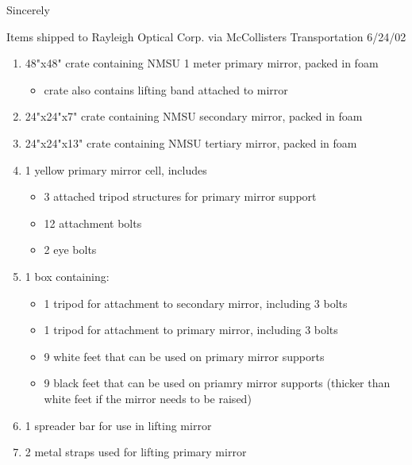 \documentclass{letter}
\begin{document}
\begin{letter}
\closing{Sincerely}

\newpage

Items shipped to Rayleigh Optical Corp. via McCollisters Transportation
         6/24/02

\begin{enumerate}
\item 48"x48" crate containing NMSU 1 meter primary mirror, packed in foam
  \begin{itemize}
   \item crate also contains lifting band attached to mirror
  \end{itemize}

\item 24"x24"x7" crate containing NMSU secondary mirror, packed in foam

\item 24"x24"x13" crate containing NMSU tertiary mirror, packed in foam

\item 1 yellow primary mirror cell, includes
  \begin{itemize}
     \item 3 attached tripod structures for primary mirror support
     \item 12 attachment bolts
     \item 2 eye bolts
  \end{itemize}

\item 1 box containing:
  \begin{itemize}
     \item 1 tripod for attachment to secondary mirror, including 3 bolts
     \item 1 tripod for attachment to primary mirror, including 3 bolts
     \item 9 white feet that can be used on primary mirror supports
     \item 9 black feet that can be used on priamry mirror supports (thicker than
       white feet if the mirror needs to be raised)
  \end{itemize}

\item 1 spreader bar for use in lifting mirror

\item 2 metal straps used for lifting primary mirror

\end{enumerate}
\end{letter}
\end{document}
